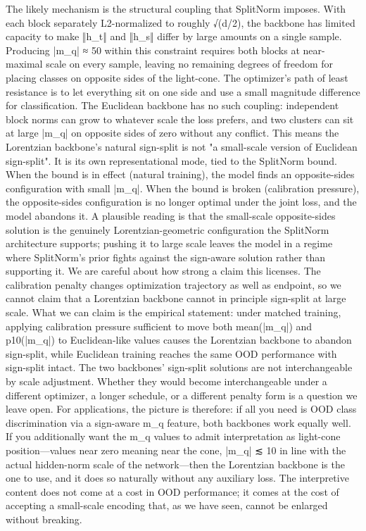 The likely mechanism is the structural coupling that SplitNorm imposes. With each block separately L2-normalized to roughly √(d/2), the backbone has limited capacity to make ‖h_t‖ and ‖h_s‖ differ by large amounts on a single sample. Producing |m_q| ≈ 50 within this constraint requires both blocks at near-maximal scale on every sample, leaving no remaining degrees of freedom for placing classes on opposite sides of the light-cone. The optimizer's path of least resistance is to let everything sit on one side and use a small magnitude difference for classification. The Euclidean backbone has no such coupling: independent block norms can grow to whatever scale the loss prefers, and two clusters can sit at large |m_q| on opposite sides of zero without any conflict.
This means the Lorentzian backbone's natural sign-split is not "a small-scale version of Euclidean sign-split". It is its own representational mode, tied to the SplitNorm bound. When the bound is in effect (natural training), the model finds an opposite-sides configuration with small |m_q|. When the bound is broken (calibration pressure), the opposite-sides configuration is no longer optimal under the joint loss, and the model abandons it. A plausible reading is that the small-scale opposite-sides solution is the genuinely Lorentzian-geometric configuration the SplitNorm architecture supports; pushing it to large scale leaves the model in a regime where SplitNorm's prior fights against the sign-aware solution rather than supporting it.
We are careful about how strong a claim this licenses. The calibration penalty changes optimization trajectory as well as endpoint, so we cannot claim that a Lorentzian backbone cannot in principle sign-split at large scale. What we can claim is the empirical statement: under matched training, applying calibration pressure sufficient to move both mean(|m_q|) and p10(|m_q|) to Euclidean-like values causes the Lorentzian backbone to abandon sign-split, while Euclidean training reaches the same OOD performance with sign-split intact. The two backbones' sign-split solutions are not interchangeable by scale adjustment. Whether they would become interchangeable under a different optimizer, a longer schedule, or a different penalty form is a question we leave open.
For applications, the picture is therefore: if all you need is OOD class discrimination via a sign-aware m_q feature, both backbones work equally well. If you additionally want the m_q values to admit interpretation as light-cone position—values near zero meaning near the cone, |m_q| ≲ 10 in line with the actual hidden-norm scale of the network—then the Lorentzian backbone is the one to use, and it does so naturally without any auxiliary loss. The interpretive content does not come at a cost in OOD performance; it comes at the cost of accepting a small-scale encoding that, as we have seen, cannot be enlarged without breaking.
